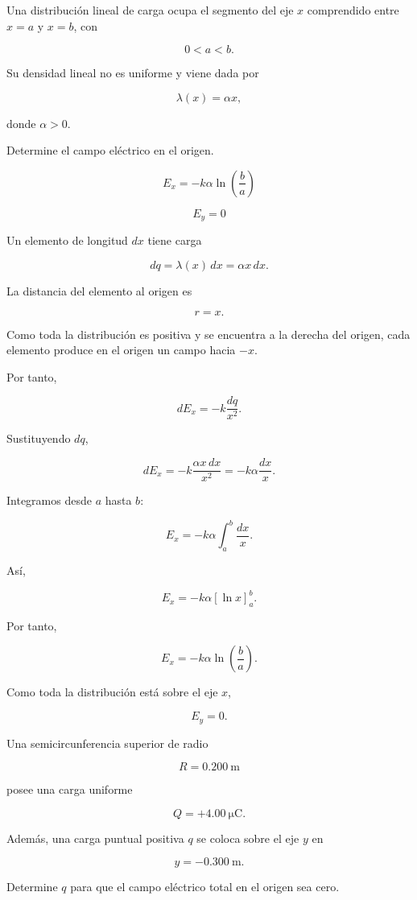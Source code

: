 \begin{ejercicio}

Una distribución lineal de carga ocupa el segmento del eje \(x\) comprendido entre \(x=a\) y \(x=b\), con

\[
0<a<b.
\]

Su densidad lineal no es uniforme y viene dada por

\[
\lambda(x)=\alpha x,
\]

donde \(\alpha>0\).

Determine el campo eléctrico en el origen.

\end{ejercicio}

\begin{respuesta}

\[
\boxed{
E_x=-k\alpha\ln\left(\frac{b}{a}\right)
}
\]

\[
\boxed{E_y=0}
\]

\end{respuesta}

\begin{explicacion}

Un elemento de longitud \(dx\) tiene carga

\[
dq=\lambda(x)\,dx=\alpha x\,dx.
\]

La distancia del elemento al origen es

\[
r=x.
\]

Como toda la distribución es positiva y se encuentra a la derecha del origen, cada elemento produce en el origen un campo hacia \(-x\).

Por tanto,

\[
dE_x=-k\frac{dq}{x^2}.
\]

Sustituyendo \(dq\),

\[
dE_x=-k\frac{\alpha x\,dx}{x^2}
=-k\alpha\frac{dx}{x}.
\]

Integramos desde \(a\) hasta \(b\):

\[
E_x=-k\alpha\int_a^b\frac{dx}{x}.
\]

Así,

\[
E_x=-k\alpha[\ln x]_a^b.
\]

Por tanto,

\[
\boxed{
E_x=-k\alpha\ln\left(\frac{b}{a}\right)
}.
\]

Como toda la distribución está sobre el eje \(x\),

\[
\boxed{E_y=0}.
\]

\end{explicacion}


\begin{ejercicio}

Una semicircunferencia superior de radio

\[
R=\SI{0.200}{\metre}
\]

posee una carga uniforme

\[
Q=+\SI{4.00}{\micro\coulomb}.
\]

Además, una carga puntual positiva \(q\) se coloca sobre el eje \(y\) en

\[
y=-\SI{0.300}{\metre}.
\]

Determine \(q\) para que el campo eléctrico total en el origen sea cero.

\end{ejercicio}

